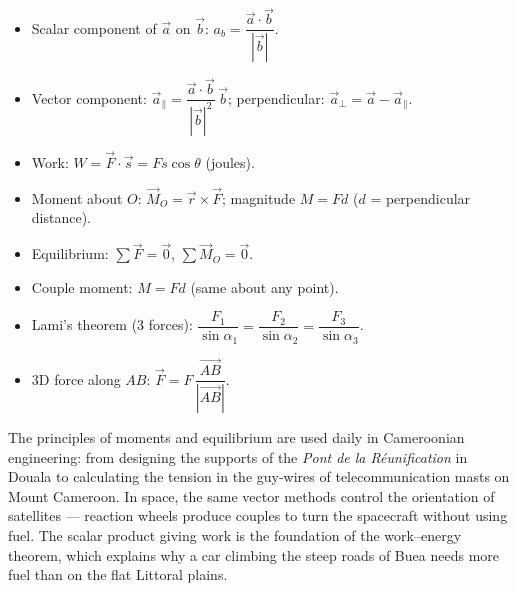 \documentclass[11pt]{article}
\begin{document}
\begin{aretenir}
\begin{itemize}
\item Scalar component of $\vec{a}$ on $\vec{b}$: $a_b = \dfrac{\vec{a}\cdot\vec{b}}{|\vec{b}|}$.
\item Vector component: $\vec{a}_{\parallel} = \dfrac{\vec{a}\cdot\vec{b}}{|\vec{b}|^2}\,\vec{b}$; perpendicular: $\vec{a}_{\perp} = \vec{a} - \vec{a}_{\parallel}$.
\item Work: $W = \vec{F}\cdot\vec{s} = Fs\cos\theta$ (joules).
\item Moment about $O$: $\vec{M}_O = \vec{r}\times\vec{F}$; magnitude $M = Fd$ ($d$ = perpendicular distance).
\item Equilibrium: $\sum\vec{F}=\vec{0}$, $\sum\vec{M}_O=\vec{0}$.
\item Couple moment: $M = Fd$ (same about any point).
\item Lami's theorem (3 forces): $\dfrac{F_1}{\sin\alpha_1} = \dfrac{F_2}{\sin\alpha_2} = \dfrac{F_3}{\sin\alpha_3}$.
\item 3D force along $AB$: $\vec{F} = F\,\dfrac{\overrightarrow{AB}}{|\overrightarrow{AB}|}$.
\end{itemize}
\end{aretenir}

\begin{savaistu}
The principles of moments and equilibrium are used daily in Cameroonian engineering: from designing the supports of the \emph{Pont de la Réunification} in Douala to calculating the tension in the guy-wires of telecommunication masts on Mount Cameroon. In space, the same vector methods control the orientation of satellites — reaction wheels produce couples to turn the spacecraft without using fuel. The scalar product giving work is the foundation of the work–energy theorem, which explains why a car climbing the steep roads of Buea needs more fuel than on the flat Littoral plains.
\end{savaistu}
\end{document}
